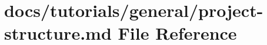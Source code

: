 \hypertarget{project-structure_8md}{}\section{docs/tutorials/general/project-\/structure.md File Reference}
\label{project-structure_8md}
